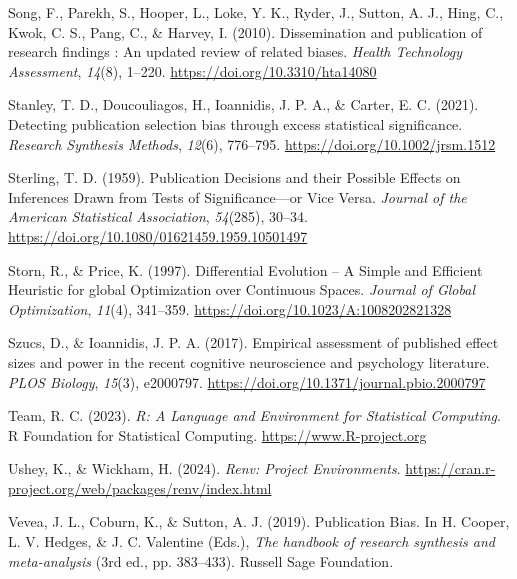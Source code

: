 \documentclass[
  12pt,
]{scrartcl}
\newlength{\cslhangindent}
\newenvironment{CSLReferences}[2] %
 {\begin{list}{}{%
  \setlength{\itemindent}{0pt}
  \setlength{\leftmargin}{0pt}
  \setlength{\parsep}{0pt}
  \ifodd #1
   \setlength{\leftmargin}{\cslhangindent}
   \setlength{\itemindent}{-1\cslhangindent}
  \fi
  \setlength{\itemsep}{#2\baselineskip}}}
 {\end{list}}
\begin{document}
\begin{CSLReferences}{1}{0}
Song, F., Parekh, S., Hooper, L., Loke, Y. K., Ryder, J., Sutton, A. J.,
Hing, C., Kwok, C. S., Pang, C., \& Harvey, I. (2010). Dissemination and
publication of research findings : An updated review of related biases.
\emph{Health Technology Assessment}, \emph{14}(8), 1--220.
\url{https://doi.org/10.3310/hta14080}

Stanley, T. D., Doucouliagos, H., Ioannidis, J. P. A., \& Carter, E. C.
(2021). Detecting publication selection bias through excess statistical
significance. \emph{Research Synthesis Methods}, \emph{12}(6), 776--795.
\url{https://doi.org/10.1002/jrsm.1512}

Sterling, T. D. (1959). Publication {Decisions} and their {Possible}
{Effects} on {Inferences} {Drawn} from {Tests} of {Significance}---or
{Vice} {Versa}. \emph{Journal of the American Statistical Association},
\emph{54}(285), 30--34.
\url{https://doi.org/10.1080/01621459.1959.10501497}

Storn, R., \& Price, K. (1997). Differential {Evolution} -- {A} {Simple}
and {Efficient} {Heuristic} for global {Optimization} over {Continuous}
{Spaces}. \emph{Journal of Global Optimization}, \emph{11}(4), 341--359.
\url{https://doi.org/10.1023/A:1008202821328}

Szucs, D., \& Ioannidis, J. P. A. (2017). Empirical assessment of
published effect sizes and power in the recent cognitive neuroscience
and psychology literature. \emph{PLOS Biology}, \emph{15}(3), e2000797.
\url{https://doi.org/10.1371/journal.pbio.2000797}

Team, R. C. (2023). \emph{R: {A} {Language} and {Environment} for
{Statistical} {Computing}}. R Foundation for Statistical Computing.
\url{https://www.R-project.org}

Ushey, K., \& Wickham, H. (2024). \emph{Renv: {Project} {Environments}}.
\url{https://cran.r-project.org/web/packages/renv/index.html}

Vevea, J. L., Coburn, K., \& Sutton, A. J. (2019). Publication {Bias}.
In H. Cooper, L. V. Hedges, \& J. C. Valentine (Eds.), \emph{The
handbook of research synthesis and meta-analysis} (3rd ed., pp.
383--433). Russell Sage Foundation.


\end{CSLReferences}
\end{document}
